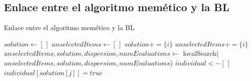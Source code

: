 \subsection{Enlace entre el algoritmo memético y la BL}
\begin{algorithm}[H]
    \caption{Enlace entre el algoritmo memético y la BL}
\begin{algorithmic}
    \State $solution \leftarrow [ \, ]$
    \State $unselectedItems \leftarrow [ \, ]$
    \State 
            \State $solution += \{i\}$
        \Else
            \State $unselectedItems += \{i\}$
        \EndIf
    \EndFor
    \State
    \State $unselectedItems, solution, dispersion, numEvaluations \leftarrow$
    \State localSearch($unselectedItems, solution, dispersion, numEvaluations$)
    \State $individual <- [ \, ]$ 
        \State $individual[solution[j]] = true$
    \EndFor
\EndProcedure
\end{algorithmic}
\end{algorithm}

